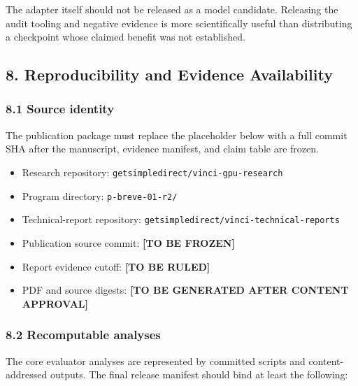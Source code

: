 \documentclass[
  9pt,
  letterpaper,
]{article}
\providecommand{\tightlist}{%
  \setlength{\itemsep}{0pt}\setlength{\parskip}{0pt}}
\begin{document}
The adapter itself should not be released as a model candidate.
Releasing the audit tooling and negative evidence is more scientifically
useful than distributing a checkpoint whose claimed benefit was not
established.

\hypertarget{8-reproducibility-and-evidence-availability}{%
\subsection{8. Reproducibility and Evidence
Availability}\label{8-reproducibility-and-evidence-availability}}

\hypertarget{81-source-identity}{%
\subsubsection{8.1 Source identity}\label{81-source-identity}}

The publication package must replace the placeholder below with a full
commit SHA after the manuscript, evidence manifest, and claim table are
frozen.

\begin{itemize}
\tightlist
\item
  Research repository: \texttt{getsimpledirect/vinci-gpu-research}
\item
  Program directory: \texttt{p-breve-01-r2/}
\item
  Technical-report repository:
  \texttt{getsimpledirect/vinci-technical-reports}
\item
  Publication source commit: \textbf{{[}TO BE FROZEN{]}}
\item
  Report evidence cutoff: \textbf{{[}TO BE RULED{]}}
\item
  PDF and source digests: \textbf{{[}TO BE GENERATED AFTER CONTENT
  APPROVAL{]}}
\end{itemize}

\hypertarget{82-recomputable-analyses}{%
\subsubsection{8.2 Recomputable
analyses}\label{82-recomputable-analyses}}

The core evaluator analyses are represented by committed scripts and
content-addressed outputs. The final release manifest should bind at
least the following:
\end{document}
